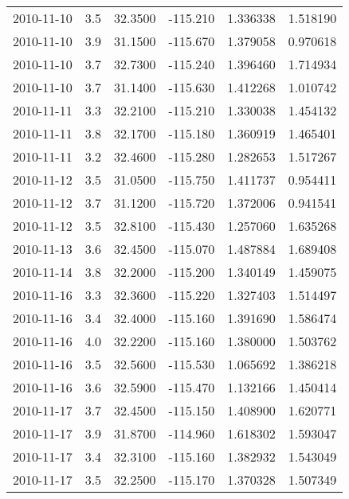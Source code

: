 \begin{tabular}{lrrrrr}
2010-11-10 &       3.5 &  32.3500 &  -115.210 &         1.336338 &         1.518190 \\
2010-11-10 &       3.9 &  31.1500 &  -115.670 &         1.379058 &         0.970618 \\
2010-11-10 &       3.7 &  32.7300 &  -115.240 &         1.396460 &         1.714934 \\
2010-11-10 &       3.7 &  31.1400 &  -115.630 &         1.412268 &         1.010742 \\
2010-11-11 &       3.3 &  32.2100 &  -115.210 &         1.330038 &         1.454132 \\
2010-11-11 &       3.8 &  32.1700 &  -115.180 &         1.360919 &         1.465401 \\
2010-11-11 &       3.2 &  32.4600 &  -115.280 &         1.282653 &         1.517267 \\
2010-11-12 &       3.5 &  31.0500 &  -115.750 &         1.411737 &         0.954411 \\
2010-11-12 &       3.7 &  31.1200 &  -115.720 &         1.372006 &         0.941541 \\
2010-11-12 &       3.5 &  32.8100 &  -115.430 &         1.257060 &         1.635268 \\
2010-11-13 &       3.6 &  32.4500 &  -115.070 &         1.487884 &         1.689408 \\
2010-11-14 &       3.8 &  32.2000 &  -115.200 &         1.340149 &         1.459075 \\
2010-11-16 &       3.3 &  32.3600 &  -115.220 &         1.327403 &         1.514497 \\
2010-11-16 &       3.4 &  32.4000 &  -115.160 &         1.391690 &         1.586474 \\
2010-11-16 &       4.0 &  32.2200 &  -115.160 &         1.380000 &         1.503762 \\
2010-11-16 &       3.5 &  32.5600 &  -115.530 &         1.065692 &         1.386218 \\
2010-11-16 &       3.6 &  32.5900 &  -115.470 &         1.132166 &         1.450414 \\
2010-11-17 &       3.7 &  32.4500 &  -115.150 &         1.408900 &         1.620771 \\
2010-11-17 &       3.9 &  31.8700 &  -114.960 &         1.618302 &         1.593047 \\
2010-11-17 &       3.4 &  32.3100 &  -115.160 &         1.382932 &         1.543049 \\
2010-11-17 &       3.5 &  32.2500 &  -115.170 &         1.370328 &         1.507349 \\

\end{tabular}
